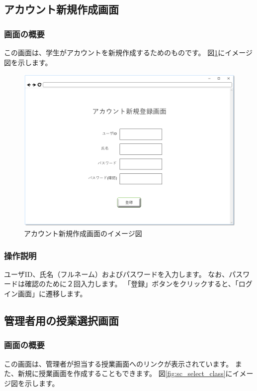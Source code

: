 \subsection{アカウント新規作成画面}
\subsubsection{画面の概要}
この画面は、学生がアカウントを新規作成するためのものです。
図\ref{fig:sc_account_creat}にイメージ図を示します。

\begin{figure}[htbp]
  \begin{center}
    \includegraphics[width=1\linewidth,clip]{./img/sc_account_creat.png}
    \caption{アカウント新規作成画面のイメージ図}\label{fig:sc_account_creat}
  \end{center}
\end{figure}

\subsubsection{操作説明}
ユーザID、氏名（フルネーム）およびパスワードを入力します。
なお、パスワードは確認のために２回入力します。
「登録」ボタンをクリックすると、「ログイン画面」に遷移します。

\subsection{管理者用の授業選択画面}
\subsubsection{画面の概要}
この画面は、管理者が担当する授業画面へのリンクが表示されています。
また、新規に授業画面を作成することもできます。
図\ref{fig:sc_select_class}にイメージ図を示します。


